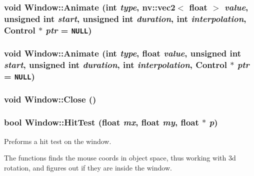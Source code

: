 \hypertarget{class_window_4515157e006e39984863e1a78e691275}{
\subsubsection[{Animate}]{\setlength{\rightskip}{0pt plus 5cm}void Window::Animate (int {\em type}, \/  {\bf nv::vec2}$<$ float $>$ {\em value}, \/  unsigned int {\em start}, \/  unsigned int {\em duration}, \/  int {\em interpolation}, \/  {\bf Control} $\ast$ {\em ptr} = {\tt NULL})}}
\label{class_window_4515157e006e39984863e1a78e691275}


\hypertarget{class_window_c5e3058acce30e972c25bdb9415a6657}{
\subsubsection[{Animate}]{\setlength{\rightskip}{0pt plus 5cm}void Window::Animate (int {\em type}, \/  float {\em value}, \/  unsigned int {\em start}, \/  unsigned int {\em duration}, \/  int {\em interpolation}, \/  {\bf Control} $\ast$ {\em ptr} = {\tt NULL})}}
\label{class_window_c5e3058acce30e972c25bdb9415a6657}


\hypertarget{class_window_4ef67808752d9e9b618859e698f31362}{
\subsubsection[{Close}]{\setlength{\rightskip}{0pt plus 5cm}void Window::Close ()}}
\label{class_window_4ef67808752d9e9b618859e698f31362}


\hypertarget{class_window_9d206d4b21db45616135e21e3b2f7b64}{
\subsubsection[{HitTest}]{\setlength{\rightskip}{0pt plus 5cm}bool Window::HitTest (float {\em mx}, \/  float {\em my}, \/  float $\ast$ {\em p})}}
\label{class_window_9d206d4b21db45616135e21e3b2f7b64}


Preforms a hit test on the window. 

The functions finds the mouse coords in object space, thus working with 3d rotation, and figures out if they are inside the window.

